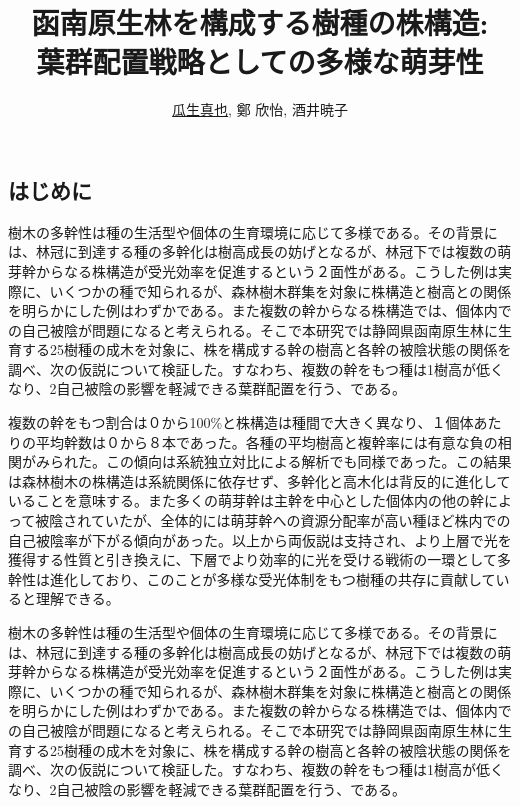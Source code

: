 \documentclass[a0, 30pt, plainboxedsections]{sciposter} %
\title{函南原生林を構成する樹種の株構造:\\葉群配置戦略としての多様な萌芽性}
\author{\underline{瓜生真也}, 鄭 欣怡, 酒井暁子}
\institute{横浜国立大・院・環境情報}
\begin{document}

\maketitle

\begin{multicols}{2}

\section*{\huge{はじめに}}

樹木の多幹性は種の生活型や個体の生育環境に応じて多様である。その背景には、林冠に到達する種の多幹化は樹高成長の妨げとなるが、林冠下では複数の萌芽幹からなる株構造が受光効率を促進するという２面性がある。こうした例は実際に、いくつかの種で知られるが、森林樹木群集を対象に株構造と樹高との関係を明らかにした例はわずかである。また複数の幹からなる株構造では、個体内での自己被陰が問題になると考えられる。そこで本研究では静岡県函南原生林に生育する25樹種の成木を対象に、株を構成する幹の樹高と各幹の被陰状態の関係を調べ、次の仮説について検証した。すなわち、複数の幹をもつ種は1樹高が低くなり、2自己被陰の影響を軽減できる葉群配置を行う、である。

複数の幹をもつ割合は０から100\%と株構造は種間で大きく異なり、１個体あたりの平均幹数は０から８本であった。各種の平均樹高と複幹率には有意な負の相関がみられた。この傾向は系統独立対比による解析でも同様であった。この結果は森林樹木の株構造は系統関係に依存せず、多幹化と高木化は背反的に進化していることを意味する。また多くの萌芽幹は主幹を中心とした個体内の他の幹によって被陰されていたが、全体的には萌芽幹への資源分配率が高い種ほど株内での自己被陰率が下がる傾向があった。以上から両仮説は支持され、より上層で光を獲得する性質と引き換えに、下層でより効率的に光を受ける戦術の一環として多幹性は進化しており、このことが多様な受光体制をもつ樹種の共存に貢献していると理解できる。

樹木の多幹性は種の生活型や個体の生育環境に応じて多様である。その背景には、林冠に到達する種の多幹化は樹高成長の妨げとなるが、林冠下では複数の萌芽幹からなる株構造が受光効率を促進するという２面性がある。こうした例は実際に、いくつかの種で知られるが、森林樹木群集を対象に株構造と樹高との関係を明らかにした例はわずかである。また複数の幹からなる株構造では、個体内での自己被陰が問題になると考えられる。そこで本研究では静岡県函南原生林に生育する25樹種の成木を対象に、株を構成する幹の樹高と各幹の被陰状態の関係を調べ、次の仮説について検証した。すなわち、複数の幹をもつ種は1樹高が低くなり、2自己被陰の影響を軽減できる葉群配置を行う、である。


\end{multicols}
\end{document}
